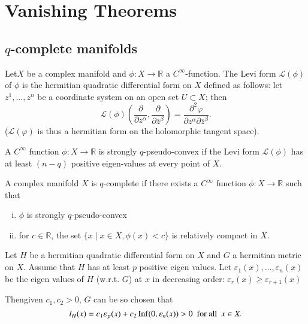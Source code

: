 \chapter{Vanishing Theorems}\label{chap4}%

\setcounter{section}{11}
\section{$q$-complete manifolds}%

Let\pageoriginale $X$ be a complex manifold and $\phi:X \rightarrow
\mathbb{R}$ a $C^\infty$-function. The Levi form $\mathscr{L}(\phi)$
of $\phi$ is the hermitian quadratic differential form on $X$ defined
as follows: let $z^1,...,z^n$ be a coordinate system on an open set
$U \subset X$; then  
$$ 
\mathscr{L}(\phi)\left(\dfrac{\partial}{\partial z^\alpha},
\dfrac{\partial}{\partial \overline{z}^\beta}\right)=\frac{\partial^2
  \varphi}{\partial z^\alpha \partial\overline{z}^\beta}.
$$
($\mathscr{L}(\varphi)$ is thus a hermitian form on the  holomorphic
tangent space). 

\setcounter{definition}{0}
\begin{definition}\label{chap4:def4.1}%
  A $C^\infty$ function $\phi:X \rightarrow \mathbb{R}$ is strongly
  $q$-pseudo-convex if the Levi form $\mathscr{L}(\phi)$ has at least
  $(n-q)$ positive eigen-values at every point of $X$. 
\end{definition}

\begin{definition}\label{chap4:def4.2}%
  A complex manifold $X$ is $q$-complete if there exists a $C^\infty$
  function $\phi:X \rightarrow \mathbb{R}$ such that 
  \begin{enumerate}[(i)]
  \item $\phi$ is strongly $q$-pseudo-convex
   
  \item for $c \in \mathbb{R}$, the set $\big\{ x\mid x \in X, \phi
    (x)< c\big\}$ is relatively compact in $X$. 
  \end{enumerate}
\end{definition}

\begin{lemma}[E. Calabi]\label{chap4:lem4.1}%
  Let $H$ be a hermitian quadratic differential form on $X$ and $G$ a
  hermitian metric on $X$. Assume that $H$ has at least $p$ positive eigen
  values. Let ${\varepsilon_1(x),...,\varepsilon_n(x)}$ be the
  eigen values of $H$ (w.r.t. $G$) at $x$ in decreasing order: $
  {\varepsilon_r(x) \ge \varepsilon_{r+1}(x)}$ 

  Then\pageoriginale given $c_1, c_2 > 0$, $G$ can be so chosen that  
  $$
l_H(x) = c_1 \varepsilon_p(x)+ c_2  \operatorname{Inf} (0,\varepsilon_n(x))>0
 ~ \text{ for all } ~ x \in X.
$$  
\end{lemma}


